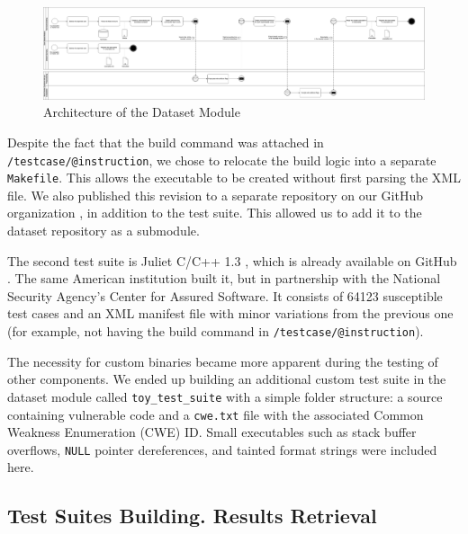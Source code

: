 \documentclass[../main.tex]{subfiles}
\begin{document}
\begin{landscape}
\vspace*{\fill}
\renewcommand*\figurename{Figure}
\begin{figure}[!h]
   \centering
    \includegraphics[width=0.95\linewidth]{images/dataset.png}
    \caption{Architecture of the Dataset Module}
    \label{fig:dataset_architecture}
\end{figure}
\vspace*{\fill}
\end{landscape}

Despite the fact that the build command was attached in
\texttt{/testcase/@instruction}, we chose to relocate the build logic
into a separate \texttt{Makefile}. This allows the executable to be
created without first parsing the XML file. We also published this
revision to a separate repository on our GitHub organization \cite{nist_c_test_suite_repo}, in
addition to the test suite. This allowed us to add it to the dataset
repository as a submodule.

The second test suite is Juliet C/C++ 1.3 \cite{nist_juliet}, which is already available on
GitHub \cite{nist_juliet_repo}. The same American institution built it, but in partnership with
the National Security Agency's Center for Assured Software. It consists
of 64123 susceptible test cases and an XML manifest file with minor
variations from the previous one (for example, not having the build
command in \texttt{/testcase/@instruction}).

The necessity for custom binaries became more apparent during the
testing of other components. We ended up building an additional custom
test suite in the dataset module called \texttt{toy\_test\_suite} with a
simple folder structure: a source containing vulnerable code and a
\texttt{cwe.txt} file with the associated Common Weakness Enumeration (CWE) ID. Small executables such
as stack buffer overflows, \texttt{NULL} pointer dereferences, and
tainted format strings were included here.

\hypertarget{test-suites-building.-results-retrieval}{%
\subsection{Test Suites Building. Results
Retrieval}\label{test-suites-building.-results-retrieval}}
\end{document}
